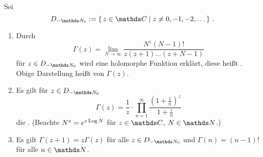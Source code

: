 \begin{satz-noind}\label{satz:gamma-fkt}
Sei
\[
	D_{-\NN_0}
	:= \Set{z\in\CC \mid z\not= 0, -1, -2, \ldots}
	\,.
\]
\begin{enumerate}
\item Durch
\[
	\Gamma(z)
	= \lim _ {N\to\infty} \frac{N^z(N-1)!}{z(z+1)\ldots(z+N-1)}
\]
für $z\in D_{-\NN_0}$ wird eine holomorphe Funktion erklärt, diese heißt . Obige Darstellung heißt  von $\Gamma(z)$.

\item Es gilt für $z\in D_{-\NN_0}$
\[
	\Gamma(z) = \frac{1}{z} \cdot \prod_{n=1}^\infty \frac{\left(1+\frac{1}{n}\right)^z}{1+\frac{z}{n}}
\]
die .
(Beachte $N^z = e^{z\operatorname{Log} N}$ für $z\in\CC$, $N \in \NN$.)
\item Es gilt $\Gamma(z+1) = z\Gamma(z)$ für alle $z\in D_{-\NN_0}$ und $\Gamma(n) = (n-1)!$ für alle $n\in\NN$.
\end{enumerate}
\end{satz-noind}

